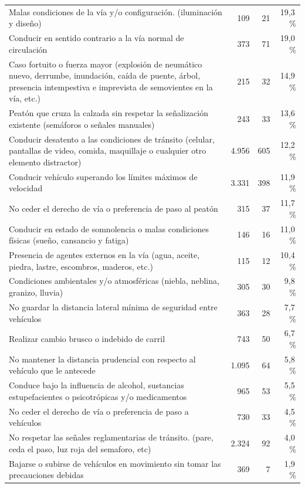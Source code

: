 \begin{longtable}{p{7.5cm}rrr}
Malas condiciones de la vía y/o configuración. (iluminación y diseño) & 109 & 21 & 19,3\,\% \\
Conducir en sentido contrario a la vía normal de circulación & 373 & 71 & 19,0\,\% \\
Caso fortuito o fuerza mayor (explosión de neumático nuevo, derrumbe, inundación, caída de puente, árbol, presencia intempestiva e imprevista de semovientes en la vía, etc.) & 215 & 32 & 14,9\,\% \\
Peatón que cruza la calzada sin respetar la señalización existente (semáforos o señales manuales) & 243 & 33 & 13,6\,\% \\
Conducir desatento a las condiciones de tránsito (celular, pantallas de video, comida, maquillaje o cualquier otro elemento distractor) & 4.956 & 605 & 12,2\,\% \\
Conducir vehículo superando los límites máximos de velocidad & 3.331 & 398 & 11,9\,\% \\
No ceder el derecho de vía o preferencia de paso al peatón & 315 & 37 & 11,7\,\% \\
Conducir en estado de somnolencia o malas condiciones físicas (sueño, cansancio y fatiga) & 146 & 16 & 11,0\,\% \\
Presencia de agentes externos en la vía (agua, aceite, piedra, lastre, escombros, maderos, etc.) & 115 & 12 & 10,4\,\% \\
Condiciones ambientales y/o atmosféricas (niebla, neblina, granizo, lluvia) & 305 & 30 & 9,8\,\% \\
No guardar la distancia lateral mínima de seguridad entre vehículos & 363 & 28 & 7,7\,\% \\
Realizar cambio brusco o indebido de carril & 743 & 50 & 6,7\,\% \\
No mantener la distancia prudencial con respecto al vehículo que le antecede & 1.095 & 64 & 5,8\,\% \\
Conduce bajo la influencia de alcohol, sustancias estupefacientes o psicotrópicas y/o medicamentos & 965 & 53 & 5,5\,\% \\
No ceder el derecho de vía o preferencia de paso a vehículos & 730 & 33 & 4,5\,\% \\
No respetar las señales reglamentarias de tránsito. (pare, ceda el paso, luz roja del semaforo, etc) & 2.324 & 92 & 4,0\,\% \\
Bajarse o subirse de vehículos en movimiento sin tomar las precauciones debidas & 369 & 7 & 1,9\,\% \\
\end{longtable}

